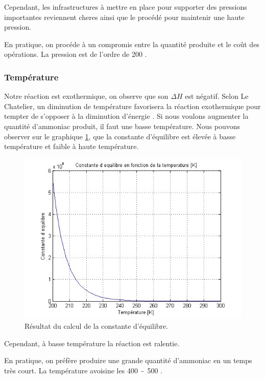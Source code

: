 Cependant, les infrastructures à mettre en place pour supporter des pressions
importantes reviennent cheres ainsi que le procédé pour maintenir une haute pression.

En pratique, on procéde à un compromis entre la quantité produite et le coût des opérations.
La pression est de l'ordre de \unit{200}{\bbar} \cite{HaberB}.

\subsubsection{Température}
Notre réaction est exothermique, on observe que son $\Delta H$ est négatif.
Selon Le Chatelier, un diminution de température favorisera la réaction 
exothermique pour tempter de s'opposer à la diminution d'énergie \cite{LeChatelier}. 
Si nous voulons augmenter la quantité d'ammoniac produit, il faut une basse température.
Nous pouvons observer sur le graphique \ref{fig:constantK}, que 
la constante d'équilibre est élevée à basse température et faible à haute température.

\begin{figure}
	\centering
	\includegraphics[scale=0.48]{media/grapheK200-300.jpg}
	\caption{Résultat du calcul de la constante d'équilibre.}
	\label{fig:constantK}
\end{figure}

Cependant, à basse température la réaction est ralentie. 

En pratique, on préfère produire une grande quantité d'ammoniac en un temps très court. 
La température avoisine les \unit{400-500}{\degreecelsius} \cite{HaberB}.

